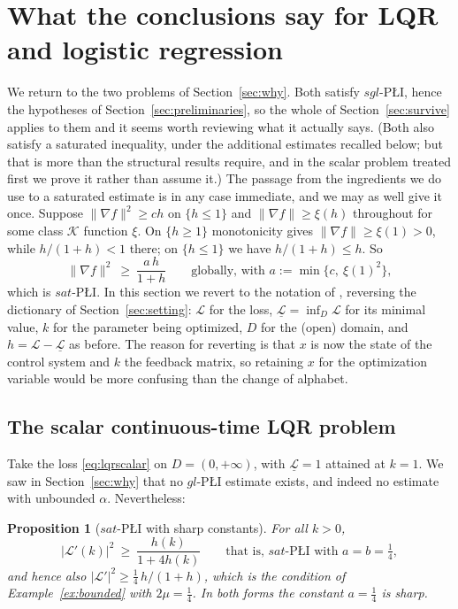 \documentclass[11pt]{article}
\theoremstyle{plain}
\newtheorem{prop}[thm]{Proposition}
\theoremstyle{definition}
\theoremstyle{remark}
\begin{document}
\section{What the conclusions say for LQR and logistic regression}
\label{sec:applications}

We return to the two problems of Section~\ref{sec:why}. Both satisfy
$sgl$-P\L{}I, hence the hypotheses of Section~\ref{sec:preliminaries}, so the
whole of Section~\ref{sec:survive} applies to them and it seems worth reviewing
what it actually says. (Both also satisfy a saturated inequality, under the
additional estimates recalled below; but that is more than the structural results
require, and in the scalar problem treated first we prove it rather than assume
it.) The passage from the ingredients we do use to a saturated estimate is in any
case immediate, and we may as well give it once. Suppose $\|\nabla f\|^2\ge ch$ on
$\{h\le1\}$ and $\|\nabla f\|\ge\xi(h)$ throughout for some class $\mathcal{K}$
function $\xi$. On $\{h\ge1\}$ monotonicity gives $\|\nabla f\|\ge\xi(1)>0$, while
$h/(1+h)<1$ there; on $\{h\le1\}$ we have $h/(1+h)\le h$. So
\[
  \|\nabla f\|^2 \ \ge\ \frac{a\,h}{1+h}
  \qquad\text{globally, with } a := \min\{c,\ \xi(1)^2\} ,
\]
which is $sat$-P\L{}I. In this
section we revert to the notation of \cite{Sontag2025L4DC}, reversing the
dictionary of Section~\ref{sec:setting}: $\mathcal{L}$ for the loss,
$\underline{\mathcal{L}} = \inf_D\mathcal{L}$ for its minimal value, $k$ for the
parameter being optimized, $D$ for the (open) domain, and
$h = \mathcal{L}-\underline{\mathcal{L}}$ as before. The reason for reverting is
that $x$ is now the state of the control system and $k$ the feedback matrix, so
retaining $x$ for the optimization variable would be more confusing than the
change of alphabet.

\subsection{The scalar continuous-time LQR problem}

Take the loss \eqref{eq:lqrscalar} on $D=(0,+\infty)$, with
$\underline{\mathcal{L}}=1$ attained at $k=1$. We saw in Section~\ref{sec:why}
that no $gl$-P\L{}I estimate exists, and indeed no estimate with unbounded
$\alpha$. Nevertheless:

\begin{prop}[$sat$-P\L{}I with sharp constants]\label{prop:lqrsat}
For all $k>0$,
\[
  |\mathcal{L}'(k)|^2 \ \ge\ \frac{h(k)}{1+4h(k)}
  \qquad\text{that is, } sat\text{-P\L{}I with } a=b=\tfrac14 ,
\]
and hence also $|\mathcal{L}'|^2 \ge \tfrac14\,h/(1+h)$, which is the condition of
Example~\ref{ex:bounded} with $2\mu=\tfrac14$. In both forms the constant
$a=\tfrac14$ is sharp.
\end{prop}
\end{document}

